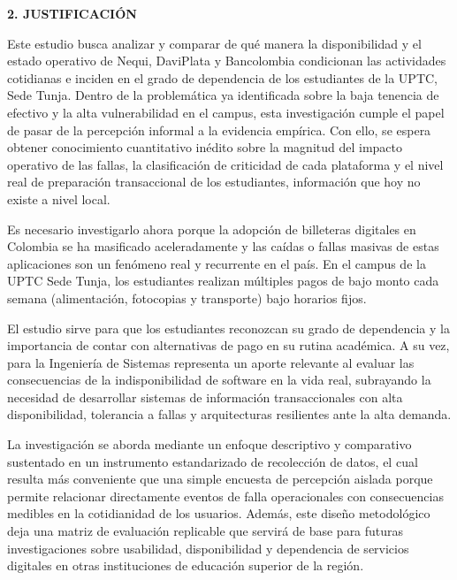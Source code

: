 \hypertarget{sec:justificacion}{}%
\begin{center}
    {\Large\bfseries 2. JUSTIFICACIÓN}
\end{center}
\vspace{1em}

Este estudio busca analizar y comparar de qué manera la disponibilidad y el estado operativo de Nequi, DaviPlata y Bancolombia condicionan las actividades cotidianas e inciden en el grado de dependencia de los estudiantes de la UPTC, Sede Tunja. Dentro de la problemática ya identificada sobre la baja tenencia de efectivo y la alta vulnerabilidad en el campus, esta investigación cumple el papel de pasar de la percepción informal a la evidencia empírica. Con ello, se espera obtener conocimiento cuantitativo inédito sobre la magnitud del impacto operativo de las fallas, la clasificación de criticidad de cada plataforma y el nivel real de preparación transaccional de los estudiantes, información que hoy no existe a nivel local.

Es necesario investigarlo ahora porque la adopción de billeteras digitales en Colombia se ha masificado aceleradamente y las caídas o fallas masivas de estas aplicaciones son un fenómeno real y recurrente en el país. En el campus de la UPTC Sede Tunja, los estudiantes realizan múltiples pagos de bajo monto cada semana (alimentación, fotocopias y transporte) bajo horarios fijos.

El estudio sirve para que los estudiantes reconozcan su grado de dependencia y la importancia de contar con alternativas de pago en su rutina académica. A su vez, para la Ingeniería de Sistemas representa un aporte relevante al evaluar las consecuencias de la indisponibilidad de software en la vida real, subrayando la necesidad de desarrollar sistemas de información transaccionales con alta disponibilidad, tolerancia a fallas y arquitecturas resilientes ante la alta demanda.

La investigación se aborda mediante un enfoque descriptivo y comparativo sustentado en un instrumento estandarizado de recolección de datos, el cual resulta más conveniente que una simple encuesta de percepción aislada porque permite relacionar directamente eventos de falla operacionales con consecuencias medibles en la cotidianidad de los usuarios. Además, este diseño metodológico deja una matriz de evaluación replicable que servirá de base para futuras investigaciones sobre usabilidad, disponibilidad y dependencia de servicios digitales en otras instituciones de educación superior de la región.
